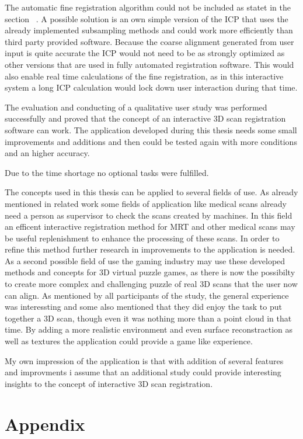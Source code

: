 \documentclass[hyperref,english,bachelorofscience,bibnum,twoside]{cgvpub}
\begin{document}
The automatic fine registration algorithm could not be included as statet in the section ~. A possible solution is an own simple version of the ICP that uses the already implemented subsampling methods and could work more efficiently than third party provided software. Because the coarse alignment generated from user input is quite accurate the ICP would not need to be as strongly optimized as other versions that are used in fully automated registration software. This would also enable real time calculations of the fine registration, as in this interactive system a long ICP calculation would lock down user interaction during that time.

The evaluation and conducting of a qualitative user study was performed successfully and proved that the concept of an interactive 3D scan registration software can work. The application developed during this thesis needs some small improvements and additions and then could be tested again with more conditions and an higher accuracy.

Due to the time shortage no optional tasks were fulfilled.

The concepts used in this thesis can be applied to several fields of use. As already mentioned in related work some fields of application like medical scans already need a person as supervisor to check the scans created by machines. In this field an efficent interactive registration method for MRT and other medical scans may be useful replenishment to enhance the processing of these scans. In order to refine this method further research in improvements to the application is needed.
As a second possible field of use the gaming industry may use these developed methods and concepts for 3D virtual puzzle games, as there is now the possibilty to create more complex and challenging puzzle of real 3D scans that the user now can align. As mentioned by all participants of the study, the general experience was interessting and some also mentioned that they did enjoy the task to put together a 3D scan, though even it was nothing more than a point cloud in that time. By adding a more realistic environment and even surface reconstraction as well as textures the application could provide a game like experience.

My own impression of the application is that with addition of several features and improvments i assume that an additional study could provide interesting insights to the concept of interactive 3D scan registration.

\chapter{Appendix}
\end{document}
